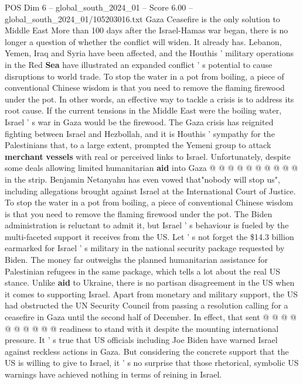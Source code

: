 \begin{textsample}{POS Dim 6 – global\_south\_2024\_01 – Score 6.00 – global\_south\_2024\_01/105203016.txt}  \label{ex:f6_pos_099}
Gaza Ceasefire is the only solution to Middle East More than 100 days after the Israel-Hamas war began, there is no longer a question of whether the conflict will widen.
It already has.
Lebanon, Yemen, Iraq and Syria have been affected, and the Houthis ' military operations in the Red \textbf{Sea} have illustrated an expanded conflict ' s potential to cause disruptions to world trade.
To stop the water in a pot from boiling, a piece of conventional Chinese wisdom is that you need to remove the flaming firewood under the pot.
In other words, an effective way to tackle a crisis is to address its root cause.
If the current tensions in the Middle East were the boiling water, Israel ' s war in Gaza would be the firewood.
The Gaza crisis has reignited fighting between Israel and Hezbollah, and it is Houthis ' sympathy for the Palestinians that, to a large extent, prompted the Yemeni group to attack \textbf{merchant} \textbf{vessels} with real or perceived links to Israel.
Unfortunately, despite some deals allowing limited humanitarian \textbf{aid} into Gaza @ @ @ @ @ @ @ @ @ @ in the strip.
Benjamin Netanyahu has even vowed that"nobody will stop us", including allegations brought against Israel at the International Court of Justice.
To stop the water in a pot from boiling, a piece of conventional Chinese wisdom is that you need to remove the flaming firewood under the pot.
The Biden administration is reluctant to admit it, but Israel ' s behaviour is fueled by the multi-faceted support it receives from the US.
Let ' s not forget the \$14.3 billion earmarked for Israel ' s military in the national security package requested by Biden.
The money far outweighs the planned humanitarian assistance for Palestinian refugees in the same package, which tells a lot about the real US stance.
Unlike \textbf{aid} to Ukraine, there is no partisan disagreement in the US when it comes to supporting Israel.
Apart from monetary and military support, the US had obstructed the UN Security Council from passing a resolution calling for a ceasefire in Gaza until the second half of December.
In effect, that sent @ @ @ @ @ @ @ @ @ @ readiness to stand with it despite the mounting international pressure.
It ' s true that US officials including Joe Biden have warned Israel against reckless actions in Gaza.
But considering the concrete support that the US is willing to give to Israel, it ' s no surprise that those rhetorical, symbolic US warnings have achieved nothing in terms of reining in Israel.

\end{textsample}
